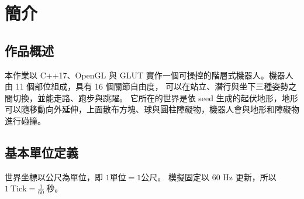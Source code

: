 \section{簡介}
\label{sec:intro}

\subsection{作品概述}

本作業以 C++17、OpenGL 與 GLUT 實作一個可操控的階層式機器人。機器人由 11 個部位組成，具有 16 個關節自由度，
可以在站立、潛行與坐下三種姿勢之間切換，並能走路、跑步與跳躍。
它所在的世界是依 seed 生成的起伏地形，地形可以隨移動向外延伸，上面散布方塊、球與圓柱障礙物，機器人會與地形和障礙物進行碰撞。

\subsection{基本單位定義}
\label{sec:unit-definition}

世界坐標以公尺為單位，即 $1 \text{單位} = 1 \text{公尺}$。
模擬固定以 60 Hz 更新，所以 $1\ \text{Tick} = \frac{1}{60}\ \text{秒}$。
